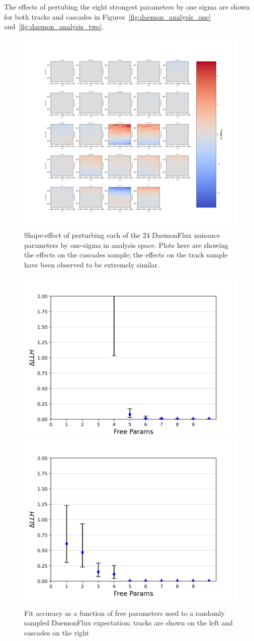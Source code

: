 \documentclass[main.tex]{subfiles}
\begin{document}
The effects of pertubing the eight strongest parameters by one sigma are shown for both tracks and cascades in Figures~\ref{fig:daemon_analysis_one} and~\ref{fig:daemon_analysis_two}.

\begin{figure}
    \centering
    \includegraphics[width=0.9\linewidth]{figures/all_grads.png}
    \caption{Shape-effect of perturbing each of the 24 DaemonFlux nuisance parameters by one-sigma in analysis space. Plots here are showing the effects on the cascades sample; the effects on the track sample have been observed to be extremely similar.}\label{fig:daemon_grads}
\end{figure}

\begin{figure}
    \centering 
    \includegraphics[width=0.45\linewidth]{figures/daemon/results_track.png}%
    \includegraphics[width=0.45\linewidth]{figures/daemon/results.png}
    \caption{Fit accuracy as a function of free parameters used to a randomly sampled DaemonFlux expectation; tracks are shown on the left and cascades on the right}\label{fig:daemon_number}
\end{figure}   
\end{document}
